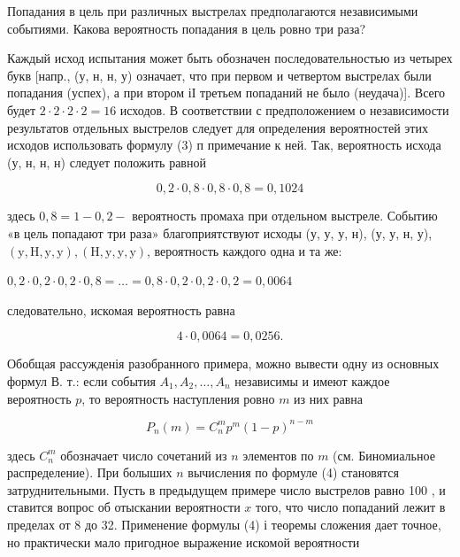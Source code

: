 \documentclass[10pt]{article}
\begin{document}
Попадания в цель при различных выстрелах предполагаются независимыми событиями. Какова вероятность попадания в цель ровно три раза?



Каждый исход испытания может быть обозначен последовательностью из четырех букв [напр., (у, н, н, у) означает, что при первом и четвертом выстрелах были попадания (успех), а при втором іІ третьем попаданий не было (неудача)]. Всего будет $2 \cdot 2 \cdot 2 \cdot 2=16$ исходов. В соответствии с предположением о независимости результатов отдельных выстрелов следует для определения вероятностей этих исходов использовать формулу (3) п примечание к ней. Так, вероятность исхода (у, н, н, н) следует положить равной



\[

0,2 \cdot 0,8 \cdot 0,8 \cdot 0,8=0,1024

\]



здесь $0,8=1-0,2-$ вероятность промаха при отдельном выстреле. Событию «в цель попадают три раза» благоприятствуют исходы (у, у, у, н), (у, у, н, у), $(\mathrm{y}, \mathbf{\mathrm { H }}, \mathrm{y}, \mathrm{y}),(\mathbf{\mathrm { H }}, \mathrm{y}, \mathrm{y}, \mathrm{y})$, вероятность каждого одна и та же:



$0,2 \cdot 0,2 \cdot 0,2 \cdot 0,8=\ldots=0,8 \cdot 0,2 \cdot 0,2 \cdot 0,2=0,0064$



следовательно, искомая вероятность равна



\[

4 \cdot 0,0064=0,0256 .

\]



Обобщая рассужденія разобранного примера, можно вывести одну из основных формул В. т.: если события $A_{1}, A_{2}, \ldots, A_{n}$ независимы и имеют каждое вероятность $p$, то вероятность наступления ровно $m$ из них равна



\[

P_{n}(m)=C_{n}^{m} p^{m}(1-p)^{n-m}

\]



здесь $C_{n}^{m}$ обозначает число сочетаний из $n$ элементов по $m$ (см. Биномиальное распределение). При болыших $n$ вычисления по формуле (4) становятся затруднительными. Пусть в предыдущем примере число выстрелов равно 100 , и ставится вопрос об отыскании вероятности $x$ того, что число попаданий лежит в пределах от 8 до 32. Применение формулы (4) і теоремы сложения дает точное, но практически мало пригодное выражение искомой вероятности
\end{document}
